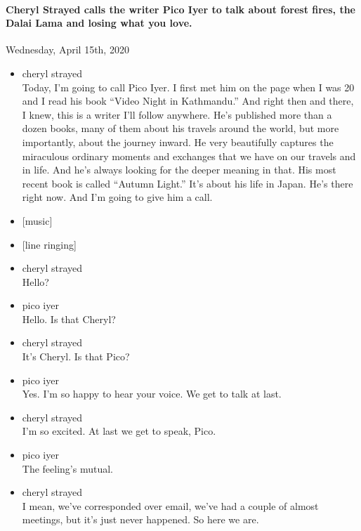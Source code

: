 \hypertarget{cheryl-strayed-calls-the-writer-pico-iyer-to-talk-about-forest-fires-the-dalai-lama-and-losing-what-you-love}{%
\paragraph{Cheryl Strayed calls the writer Pico Iyer to talk about
forest fires, the Dalai Lama and losing what you
love.}\label{cheryl-strayed-calls-the-writer-pico-iyer-to-talk-about-forest-fires-the-dalai-lama-and-losing-what-you-love}}

Wednesday, April 15th, 2020

\begin{itemize}
\item
  cheryl strayed\\
  Today, I'm going to call Pico Iyer. I first met him on the page when I
  was 20 and I read his book ``Video Night in Kathmandu.'' And right
  then and there, I knew, this is a writer I'll follow anywhere. He's
  published more than a dozen books, many of them about his travels
  around the world, but more importantly, about the journey inward. He
  very beautifully captures the miraculous ordinary moments and
  exchanges that we have on our travels and in life. And he's always
  looking for the deeper meaning in that. His most recent book is called
  ``Autumn Light.'' It's about his life in Japan. He's there right now.
  And I'm going to give him a call.
\item
  {[}music{]}
\item
  {[}line ringing{]}
\item
  cheryl strayed\\
  Hello?
\item
  pico iyer\\
  Hello. Is that Cheryl?
\item
  cheryl strayed\\
  It's Cheryl. Is that Pico?
\item
  pico iyer\\
  Yes. I'm so happy to hear your voice. We get to talk at last.
\item
  cheryl strayed\\
  I'm so excited. At last we get to speak, Pico.
\item
  pico iyer\\
  The feeling's mutual.
\item
  cheryl strayed\\
  I mean, we've corresponded over email, we've had a couple of almost
  meetings, but it's just never happened. So here we are.

\end{itemize}
